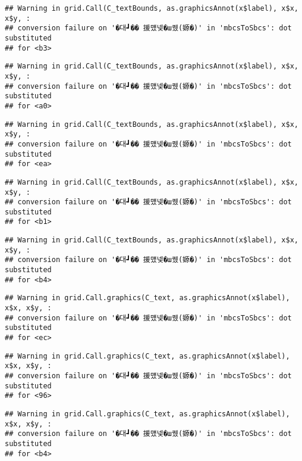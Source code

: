 \documentclass[
]{article}
\begin{document}
\begin{verbatim}
## Warning in grid.Call(C_textBounds, as.graphicsAnnot(x$label), x$x, x$y, :
## conversion failure on '�대┛�� 援먰넻�ш퀬(嫄�)' in 'mbcsToSbcs': dot substituted
## for <b3>
\end{verbatim}

\begin{verbatim}
## Warning in grid.Call(C_textBounds, as.graphicsAnnot(x$label), x$x, x$y, :
## conversion failure on '�대┛�� 援먰넻�ш퀬(嫄�)' in 'mbcsToSbcs': dot substituted
## for <a0>
\end{verbatim}

\begin{verbatim}
## Warning in grid.Call(C_textBounds, as.graphicsAnnot(x$label), x$x, x$y, :
## conversion failure on '�대┛�� 援먰넻�ш퀬(嫄�)' in 'mbcsToSbcs': dot substituted
## for <ea>
\end{verbatim}

\begin{verbatim}
## Warning in grid.Call(C_textBounds, as.graphicsAnnot(x$label), x$x, x$y, :
## conversion failure on '�대┛�� 援먰넻�ш퀬(嫄�)' in 'mbcsToSbcs': dot substituted
## for <b1>
\end{verbatim}

\begin{verbatim}
## Warning in grid.Call(C_textBounds, as.graphicsAnnot(x$label), x$x, x$y, :
## conversion failure on '�대┛�� 援먰넻�ш퀬(嫄�)' in 'mbcsToSbcs': dot substituted
## for <b4>
\end{verbatim}

\begin{verbatim}
## Warning in grid.Call.graphics(C_text, as.graphicsAnnot(x$label), x$x, x$y, :
## conversion failure on '�대┛�� 援먰넻�ш퀬(嫄�)' in 'mbcsToSbcs': dot substituted
## for <ec>
\end{verbatim}

\begin{verbatim}
## Warning in grid.Call.graphics(C_text, as.graphicsAnnot(x$label), x$x, x$y, :
## conversion failure on '�대┛�� 援먰넻�ш퀬(嫄�)' in 'mbcsToSbcs': dot substituted
## for <96>
\end{verbatim}

\begin{verbatim}
## Warning in grid.Call.graphics(C_text, as.graphicsAnnot(x$label), x$x, x$y, :
## conversion failure on '�대┛�� 援먰넻�ш퀬(嫄�)' in 'mbcsToSbcs': dot substituted
## for <b4>
\end{verbatim}
\end{document}
